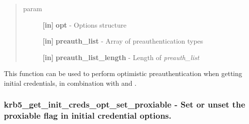 \documentclass[letterpaper,10pt,english]{sphinxmanual}
\begin{document}
\begin{fulllineitems}
\label{appdev/refs/api/krb5_get_init_creds_opt_set_preauth_list:krb5_get_init_creds_opt_set_preauth_list}
\end{fulllineitems}

\begin{quote}\begin{description}
\item[{param}] \leavevmode
\textbf{{[}in{]}} \textbf{opt} - Options structure

\textbf{{[}in{]}} \textbf{preauth\_list} - Array of preauthentication types

\textbf{{[}in{]}} \textbf{preauth\_list\_length} - Length of \emph{preauth\_list}

\end{description}\end{quote}

This function can be used to perform optimistic preauthentication when getting initial credentials, in combination with {\hyperref[appdev/refs/api/krb5_get_init_creds_opt_set_salt:krb5_get_init_creds_opt_set_salt]{}} and {\hyperref[appdev/refs/api/krb5_get_init_creds_opt_set_pa:krb5_get_init_creds_opt_set_pa]{}} .


\subsubsection{krb5\_get\_init\_creds\_opt\_set\_proxiable -  Set or unset the proxiable flag in initial credential options.}
\label{appdev/refs/api/krb5_get_init_creds_opt_set_proxiable::doc}\label{appdev/refs/api/krb5_get_init_creds_opt_set_proxiable:krb5-get-init-creds-opt-set-proxiable-set-or-unset-the-proxiable-flag-in-initial-credential-options}

\begin{fulllineitems}
\label{appdev/refs/api/krb5_get_init_creds_opt_set_proxiable:krb5_get_init_creds_opt_set_proxiable}
\end{fulllineitems}
\end{document}
